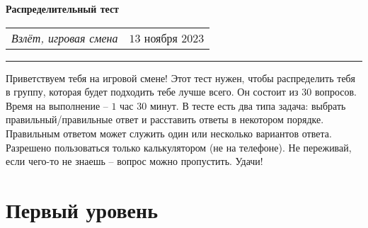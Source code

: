 \documentclass[12pt]{article}
\begin{document}
\begin{center}
	\textbf{\LARGE{Распределительный тест}}
\end{center}
\begin{tabularx}{\textwidth}{Xr}
	{\large\textit{Взлёт, игровая смена}} & $13$ ноября $2023$ \\
\end{tabularx}

\noindent\rule{\textwidth}{0.4pt}

Приветствуем тебя на игровой смене! Этот тест нужен, чтобы распределить тебя в группу, которая будет подходить тебе лучше всего. Он состоит из $30$ вопросов. Время на выполнение -- $1$ час $30$ минут. В тесте есть два типа задача: выбрать правильный/правильные ответ и расставить ответы в некотором порядке. Правильным ответом может служить один или несколько вариантов ответа. Разрешено пользоваться только калькулятором (не на телефоне). Не переживай, если чего-то не знаешь -- вопрос можно пропустить. Удачи! 

\section*{Первый уровень}
\end{document}
